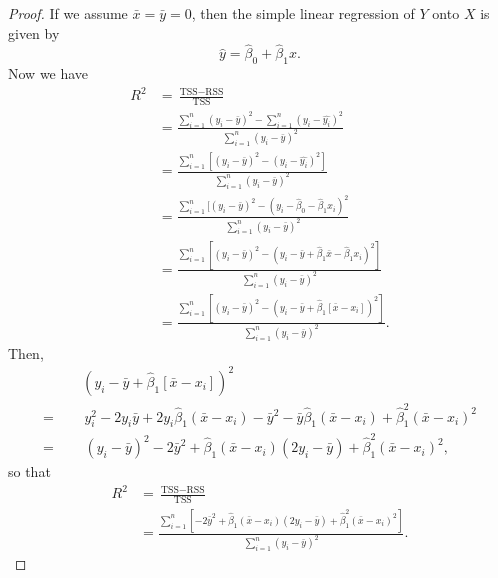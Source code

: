 
\begin{proof}
    If we assume $\bar{x} = \bar{y} = 0$, then the simple linear regression of
    $Y$ onto $X$ is given by
    \[
        \hat{y} = \hat{\beta}_0 + \hat{\beta}_1 x.
    \]
    Now we have
    \begin{equation*}
        \begin{split}
            R^2 &= \frac{\text{TSS} - \text{RSS}}{\text{TSS}} \\
                &= \frac{\sum_{i=1}^{n}{(y_i - \bar{y})}^{2} 
                    - \sum_{i=1}^{n}{(y_i - \hat{y_i})}^{2}}
                    {\sum_{i=1}^{n}{(y_i - \bar{y})}^{2}} \\
                &= \frac{\sum_{i=1}^{n}[{(y_i - \bar{y})}^{2} 
                    - {(y_i - \hat{y_i})}^{2}]}
                    {\sum_{i=1}^{n}{(y_i - \bar{y})}^{2}} \\
                &= \frac{\sum_{i=1}^{n}[{(y_i - \bar{y})}^{2} 
                    - {(y_i - \hat{\beta}_0 - \hat{\beta}_1 x_i)}^{2}}
                    {\sum_{i=1}^{n}{(y_i - \bar{y})}^{2}} \\
                &= \frac{\sum_{i=1}^{n}[{(y_i - \bar{y})}^{2} 
                    - {(y_i - \bar{y} + \hat{\beta}_1 \bar{x} 
                    - \hat{\beta}_1 x_i)}^{2}]}
                    {\sum_{i=1}^{n}{(y_i - \bar{y})}^{2}} \\
                &= \frac{\sum_{i=1}^{n}[{(y_i - \bar{y})}^{2} 
                    - {(y_i - \bar{y} + \hat{\beta}_1 [\bar{x} - x_i])}^{2}]}
                    {\sum_{i=1}^{n}{(y_i - \bar{y})}^{2}}.
        \end{split}
    \end{equation*}
    Then, 
    \begin{equation*}
        \begin{split}
            \qquad &{(y_i - \bar{y} + \hat{\beta}_1 [\bar{x} - x_i])}^{2} \\
            = &\, y_i^2 - 2y_i\bar{y} + 2y_i\hat{\beta}_1(\bar{x} - x_i)
                - \bar{y}^2 - \bar{y}\hat{\beta}_1(\bar{x} - x_i) + \hat{\beta}_1^2
                {(\bar{x} - x_i)}^{2} \\
            = &\, {(y_i - \bar{y})}^{2} - 2\bar{y}^2 + \hat{\beta}_1(\bar{x} - x_i)
                (2y_i - \bar{y}) + \hat{\beta}_1^2{(\bar{x} - x_i)}^{2},
        \end{split}
    \end{equation*}
    so that
    \begin{equation*}
        \begin{split}
            R^2 &= \frac{\text{TSS} - \text{RSS}}{\text{TSS}} \\
                &= \frac{\sum_{i=1}^{n}[-2\bar{y}^2 + \hat{\beta}_1(\bar{x} - x_i)
                (2y_i - \bar{y}) + \hat{\beta}_1^2{(\bar{x} - x_i)}^{2}]}
                    {\sum_{i=1}^{n}{(y_i - \bar{y})}^{2}}.
        \end{split}
    \end{equation*}
\end{proof}
